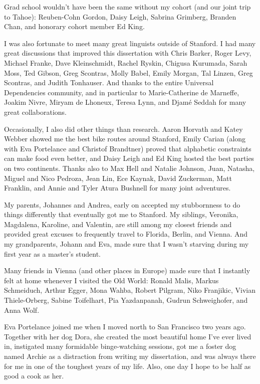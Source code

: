 Grad school wouldn't have been the same without my cohort (and our joint trip to Tahoe): Reuben-Cohn Gordon, Daisy Leigh, Sabrina Grimberg, Branden Chan, and honorary cohort member Ed King.

I was also fortunate to meet many great linguists outside of Stanford. I had many great discussions that improved this dissertation with Chris Barker, Roger Levy, Michael Franke, Dave Kleinschmidt, Rachel Ryskin, Chigusa Kurumada, Sarah Moss, Ted Gibson, Greg Scontras, Molly Babel,  Emily Morgan, Tal Linzen, Greg Scontras, and Judith Tonhauser. And thanks to the entire Universal Dependencies community, and in particular to Marie-Catherine de Marneffe, Joakim Nivre, Miryam de Lhoneux, Teresa Lynn, and Djam\'e Seddah for many great collaborations.

Occasionally, I also did other things than research. Aaron Horvath and Katey Webber showed me the best bike routes around Stanford, Emily Carian (along with Eva Portelance and Christof Brandtner) proved that alphabetic constraints can make food even better, and Daisy Leigh and Ed King hosted the best parties on two continents. Thanks also to Max Hell and Natalie Johnson, Juan, Natasha, Miguel and Nico Pedroza, Jean Lin, Ece Kaynak, David Zuckerman, Matt Franklin, and Annie and Tyler Atura Bushnell for many joint adventures.

My parents, Johannes and Andrea, early on accepted my stubbornness to do things differently that eventually got me to Stanford. My siblings, Veronika, Magdalena, Karoline, and Valentin, are still among my closest friends and provided great excuses to frequently travel to Florida, Berlin, and Vienna. And my grandparents, Johann and Eva, made sure that I wasn't starving during my first year as a master's student.

Many friends in Vienna (and other places in Europe) made sure that I instantly felt at home whenever I visited the Old World: Ronald Malis, Markus Schmeiduch, Arthur Egger, Mona Wahba, Robert Pilgram, Niko Franjikic, Vivian Thiele-Orberg, Sabine Toifelhart, Pia Yazdanpanah, Gudrun Schweighofer, and Anna Wolf.

Eva Portelance joined me when I moved north to San Francisco two years ago. Together with her dog Dora, she created the most beautiful home I've ever lived in, instigated many formidable binge-watching sessions, got me a foster dog named Archie as a distraction from writing my dissertation, and was always there for me in one of the toughest years of my life.  Also, one day I hope to be half as good a cook as her.

